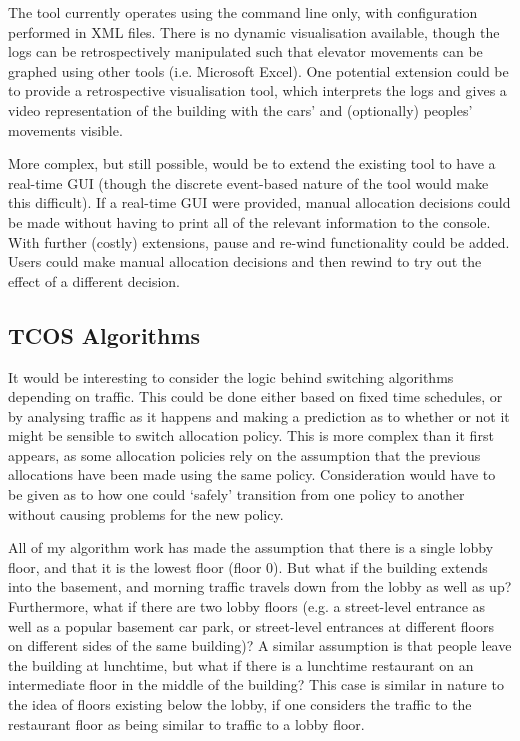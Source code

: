 \documentclass{UoYCSproject}
\begin{document}
The tool currently operates using the command line only, with configuration performed in XML files.  There is no dynamic visualisation available, though the logs can be retrospectively manipulated such that elevator movements can be graphed using other tools (i.e. Microsoft Excel).  One potential extension could be to provide a retrospective visualisation tool, which interprets the logs and gives a video representation of the building with the cars' and (optionally) peoples' movements visible.

More complex, but still possible, would be to extend the existing tool to have a real-time GUI (though the discrete event-based nature of the tool would make this difficult).  If a real-time GUI were provided, manual allocation decisions could be made without having to print all of the relevant information to the console.  With further (costly) extensions, pause and re-wind functionality could be added.  Users could make manual allocation decisions and then rewind to try out the effect of a different decision.

\subsection{TCOS Algorithms}

It would be interesting to consider the logic behind switching algorithms depending on traffic.  This could be done either based on fixed time schedules, or by analysing traffic as it happens and making a prediction as to whether or not it might be sensible to switch allocation policy.  This is more complex than it first appears, as some allocation policies rely on the assumption that the previous allocations have been made using the same policy.  Consideration would have to be given as to how one could `safely' transition from one policy to another without causing problems for the new policy.

All of my algorithm work has made the assumption that there is a single lobby floor, and that it is the lowest floor (floor 0).  But what if the building extends into the basement, and morning traffic travels down from the lobby as well as up?  Furthermore, what if there are two lobby floors (e.g. a street-level entrance as well as a popular basement car park, or street-level entrances at different floors on different sides of the same building)?  A similar assumption is that people leave the building at lunchtime, but what if there is a lunchtime restaurant on an intermediate floor in the middle of the building?  This case is similar in nature to the idea of floors existing below the lobby, if one considers the traffic to the restaurant floor as being similar to traffic to a lobby floor.
\end{document}
